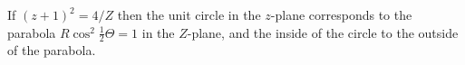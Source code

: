 If $(z + 1)^{2} = 4/Z$ then the unit circle in the $z$-plane corresponds to the
parabola $R\cos^{2} \frac{1}{2}\Theta = 1$ in the $Z$-plane, and the inside of the circle to the
outside of the parabola.


